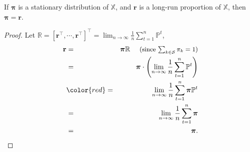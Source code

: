\begin{lemma} \label{lem:pi-eq-r}
If $ \boldsymbol\pi $ is a stationary distribution of $ \mathbb{X} $, and $ \mathbf{r} $ is a long-run proportion of $ \mathbb{X} $, then $ \boldsymbol\pi = \mathbf{r} $.

\begin{proof}
Let $ \mathbb{R} = [\mathbf{r}^{\intercal}, \cdots, \mathbf{r}^{\intercal}]^{\intercal} = \lim_{n \to \infty} \frac{1}{n} \sum_{t = 1}^{n} \mathbb{P}^{t} $,
\begin{eqnarray*}
\mathbf{r}
  & = & \boldsymbol\pi \mathbb{R}
    \text{ \hspace{1em}\small(since $ \textstyle\sum_{k \in \mathcal{S}} \pi_{k} = 1 $)} \\
  & = & \boldsymbol\pi \cdot \left( \lim_{n \to \infty} \frac{1}{n} \sum_{t = 1}^{n} \mathbb{P}^{t} \right) \\
  & {\color{red} =} & \lim_{n \to \infty} \frac{1}{n} \sum_{t = 1}^{n} \boldsymbol\pi \mathbb{P}^{t} \\
  & = & \lim_{n \to \infty} \frac{1}{n} \sum_{t = 1}^{n} \boldsymbol\pi \\
  & = & \boldsymbol\pi.
\end{eqnarray*}
\end{proof}

\begin{comment}
\begin{eqnarray*}
\left[ \boldsymbol\pi \cdot \left( \lim_{n \to \infty} \frac{1}{n} \sum_{t = 1}^{n} \mathbb{P}^{t} \right) \right] [i, j]
  & = & \sum_{k \in \mathcal{S}} \pi_{k} \cdot \left( \lim_{n \to \infty} \frac{1}{n} \sum_{t = 1}^{n} \mathbb{P}^{t} \right) [k, j] \\
  & = & \sum_{k \in \mathcal{S}} \lim_{n \to \infty} \frac{1}{n} \sum_{t = 1}^{n} \pi_{k} \cdot \mathbb{P}^{t}[k, j] \\
  & = & \lim_{m \to \infty} \lim_{n \to \infty} \frac{1}{n} \sum_{t = 1}^{n} \sum_{k = 1}^{m} \pi_{k} \cdot \mathbb{P}^{t}[k, j] \\
  & \le & \lim_{m \to \infty} \lim_{n \to \infty} \frac{1}{n} \sum_{t = 1}^{n} \sum_{k \in \mathcal{S}} \pi_{k} \cdot \mathbb{P}^{t}[k, j] \\
  & = & \lim_{m \to \infty} \lim_{n \to \infty} \frac{1}{n} \sum_{t = 1}^{n} (\boldsymbol\pi\mathbb{P}^{t}) [i, j] \\
  & = & \lim_{n \to \infty} \frac{1}{n} \sum_{t = 1}^{n} (\boldsymbol\pi\mathbb{P}^{t}) [i, j],
\end{eqnarray*}


\end{comment}
\end{lemma}
